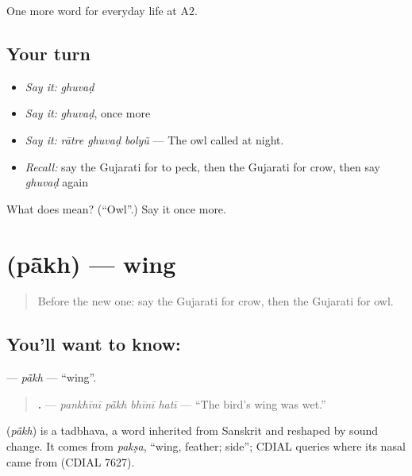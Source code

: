 \begin{grammarlens}[title={What you've built}]
One more word for everyday life at A2.
\end{grammarlens}

\subsection*{Your turn}
\begin{itemize}
\raggedright
  \item \emph{Say it:} \emph{ghuvaḍ}
  \item \emph{Say it:} \emph{ghuvaḍ}, once more
  \item \emph{Say it:} \emph{rātre ghuvaḍ bolyũ} — The owl called at night.
  \item \emph{Recall:} say the Gujarati for to peck, then the Gujarati for crow, then say \emph{ghuvaḍ} again
\end{itemize}

\begin{tcolorbox}[breakable,colback=teal!4,colframe=teal!35!black,title={Before you move on}]
What does  mean? (\textquotedblleft{}Owl\textquotedblright{}.) Say it once more.
\end{tcolorbox}
\section[\texorpdfstring{\gu{પાંખ} (pā̃kh)}{પાંખ (pā̃kh)}]{ (pā̃kh) — wing}

\label{lesson:GU-C237-pakh}



\begin{quote}
Before the new one: say the Gujarati for crow, then the Gujarati for owl.
\end{quote}

\subsection*{You'll want to know: }
\textbf{} — \emph{pā̃kh} — \textquotedblleft{}wing\textquotedblright{}.

\begin{quote}
\textbf{   .} — \emph{pankhīnī pā̃kh bhīnī hatī} — \textquotedblleft{}The bird's wing was wet.\textquotedblright{}
\end{quote}

\begin{cousinweb}
\textbf{} (\emph{pā̃kh}) is a tadbhava, a word inherited from Sanskrit and reshaped by sound change. It comes from \emph{pakṣa}, \textquotedblleft{}wing, feather; side\textquotedblright{}; CDIAL queries where its nasal came from (CDIAL 7627).
\end{cousinweb}

